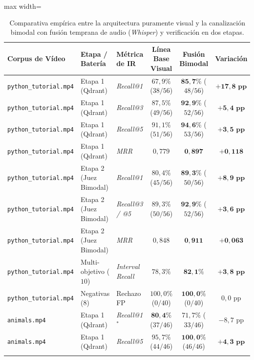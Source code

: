 \begin{table}[htbp]
\centering
\small
\setlength{\tabcolsep}{4.0pt}
\caption{Comparativa empírica entre la arquitectura puramente visual y la canalización bimodal con fusión temprana de audio (\textit{Whisper}) y verificación en dos etapas.}
\label{tab:ablacion_visual_vs_audio_consolidado}
\begin{adjustbox}{max width=\linewidth}
\begin{tabular}{lllccc}
\toprule
\textbf{Corpus de Vídeo} & \textbf{Etapa / Batería} & \textbf{Métrica de IR} & \textbf{Línea Base Visual} & \textbf{Fusión Bimodal} & \textbf{Variación} \\
\midrule
\texttt{python\_tutorial.mp4} & Etapa 1 (Qdrant) & \textit{Recall@1} & $67,9\%$ ($38/56$) & $\mathbf{85,7\%}$ ($48/56$) & $\mathbf{+17,8\text{ pp}}$ \\
\texttt{python\_tutorial.mp4} & Etapa 1 (Qdrant) & \textit{Recall@3} & $87,5\%$ ($49/56$) & $\mathbf{92,9\%}$ ($52/56$) & $\mathbf{+5,4\text{ pp}}$ \\
\texttt{python\_tutorial.mp4} & Etapa 1 (Qdrant) & \textit{Recall@5} & $91,1\%$ ($51/56$) & $\mathbf{94,6\%}$ ($53/56$) & $\mathbf{+3,5\text{ pp}}$ \\
\texttt{python\_tutorial.mp4} & Etapa 1 (Qdrant) & \textit{MRR} & $0,779$ & $\mathbf{0,897}$ & $\mathbf{+0,118}$ \\ \addlinespace[2.5pt]
\texttt{python\_tutorial.mp4} & Etapa 2 (Juez Bimodal) & \textit{Recall@1} & $80,4\%$ ($45/56$) & $\mathbf{89,3\%}$ ($50/56$) & $\mathbf{+8,9\text{ pp}}$ \\
\texttt{python\_tutorial.mp4} & Etapa 2 (Juez Bimodal) & \textit{Recall@3 / @5} & $89,3\%$ ($50/56$) & $\mathbf{92,9\%}$ ($52/56$) & $\mathbf{+3,6\text{ pp}}$ \\
\texttt{python\_tutorial.mp4} & Etapa 2 (Juez Bimodal) & \textit{MRR} & $0,848$ & $\mathbf{0,911}$ & $\mathbf{+0,063}$ \\ \addlinespace[2.5pt]
\texttt{python\_tutorial.mp4} & Multi-objetivo ($10$) & \textit{Interval Recall} & $78,3\%$ & $\mathbf{82,1\%}$ & $\mathbf{+3,8\text{ pp}}$ \\
\texttt{python\_tutorial.mp4} & Negativas ($8$) & Rechazo FP & $100,0\%$ ($0/40$) & $\mathbf{100,0\%}$ ($0/40$) & $0,0\text{ pp}$ \\
\midrule
\texttt{animals.mp4} & Etapa 1 (Qdrant) & \textit{Recall@1}$^*$ & $\mathbf{80,4\%}$ ($37/46$) & $71,7\%$ ($33/46$) & $-8,7\text{ pp}$ \\
\texttt{animals.mp4} & Etapa 1 (Qdrant) & \textit{Recall@5} & $95,7\%$ ($44/46$) & $\mathbf{100,0\%}$ ($46/46$) & $\mathbf{+4,3\text{ pp}}$ \\ \addlinespace[2.5pt]

\end{tabular}
\end{adjustbox}
\end{table}
